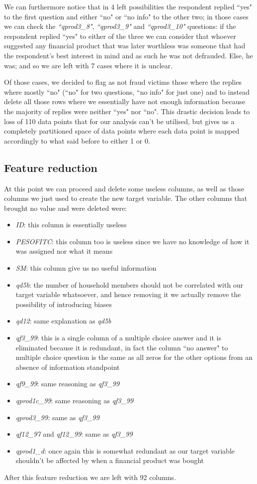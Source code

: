\documentclass[a4paper,11pt]{article}
\begin{document}
We can furthermore notice that in 4 left possibilities the respondent replied ``yes" to the first question and either ``no" or ``no info" to the other two; in those cases we can check the \textit{``qprod3\_8"}, \textit{``qprod3\_9"} and \textit{``qprod3\_10"} questions: if the respondent replied ``yes" to either of the three we can consider that whoever suggested any financial product that was later worthless was someone that had the respondent's best interest in mind and as such he was not defrauded. Else, he was; and so we are left with 7 cases where it is unclear. 

Of those cases, we decided to flag as not fraud victims those where the replies where mostly ``no" (``no" for two questions, ``no info" for just one) and to instead delete all those rows where we essentially have not enough information because the majority of replies were neither ``yes" nor ``no". This drastic decision leads to loss of 110 data points that for our analysis can't be utilised, but gives us a completely partitioned space of data points where each data point is mapped accordingly to what said before to either 1 or 0.


\subsection{Feature reduction}
At this point we can proceed and delete some useless columns, as well as those columns we just used to create the new target variable. The other columns that brought no value and were deleted were: 
\begin{itemize}
    \item \textit{ID}: this column is essentially useless 
    \item \textit{PESOFITC}: this column too is useless since we have no knowledge of how it was assigned nor what it means
    \item \textit{SM}: this column give us no useful information
    \item \textit{qd5b}: the number of household members should not be correlated with our target variable whatsoever, and hence removing it we actually remove the possibility of introducing biases
    \item \textit{qd12}: same explanation as \textit{qd5b}
    \item \textit{qf3\_99}: this is a single column of a multiple choice answer and it is eliminated because it is redundant, in fact the column ``no answer" to multiple choice question is the same as all zeros for the other options from an absence of information standpoint
    \item \textit{qf9\_99}: same reasoning as \textit{qf3\_99}
    \item \textit{qprod1c\_99}: same reasoning as \textit{qf3\_99}
    \item \textit{qprod3\_99:} same as
    \textit{qf3\_99}
    \item \textit{qf12\_97} and \textit{qf12\_99}: same as \textit{qf3\_99}
    \item \textit{qprod1\_d}: once again this is somewhat redundant as our target variable shouldn't be affected by when a financial product was bought
\end{itemize}
After this feature reduction we are left with 92 columns.
\end{document}
